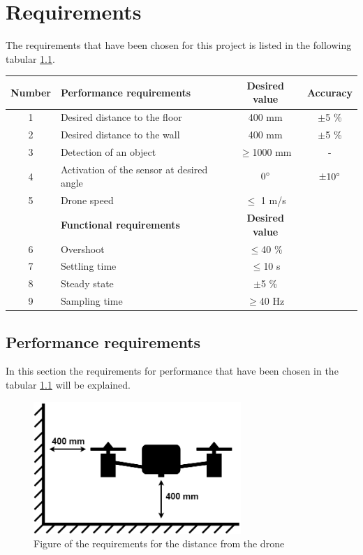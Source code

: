\chapter{Requirements}\label{ch:Req}
The requirements that have been chosen for this project is listed in the following tabular \ref{tab:req}.  

\begin{table}[H]
\begin{tabular}{|c|l|c|c|}
\hline
\textbf{Number} & \textbf{Performance requirements}  & \textbf{Desired value}& \textbf{Accuracy} \\ \hline
1 & Desired distance to the floor             & 400 mm       & $\pm$5 \% \\ \hline
2 & Desired distance to the wall              & 400 mm       & $\pm$5 \% \\ \hline
3 & Detection of an object                    & $\geq$1000 mm      & -  \\ \hline
4 & Activation of the sensor at desired angle & $0\degree$          & $\pm10 \degree$  \\ \hline
5 & Drone speed                               & $\leq$ 1 m/s &   \\ \hline
 & \textbf{Functional requirements}  & \textbf{Desired value} & \\ \hline
6 & Overshoot              & $\leq$40 \% & \\ \hline
7 & Settling time           & $\leq$10 s & \\ \hline
8 & Steady state            & $\pm$5 \% & \\ \hline
9 & Sampling time          & $\geq$40 Hz   & \\ \hline
\end{tabular}
\label{tab:req}
\end{table}

\section{Performance requirements} \label{sec:req}
In this section the requirements for performance that have been chosen in the tabular \ref{tab:req} will be explained. %

\begin{figure}[h]
    \centering
    \includegraphics[width=0.70\textwidth]{figures/ch_req/figure_requirements.png}
    \caption{Figure of the requirements for the distance from the drone}
    \label{fig:req_fig}
\end{figure}

